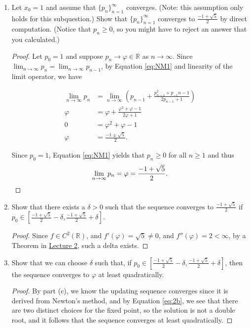 \documentclass[11pt,oneside,english,reqno]{amsart}
\theoremstyle{definition}
\newcommand{\MB}[1]{\mathbb{#1}}
\newcommand{\1}{\mathbbm{1}}
\begin{document}
\begin{enumerate}[leftmargin=*]
\begin{enumerate}
\item Let $x_0=1$ and assume that $\{p_n\}_{n=1}^\infty$ converges. (Note: this assumption only holds for this subquestion.) Show that $\{p_n\}_{n=1}^\infty$ converges to $\frac{-1+\sqrt{5}}{2}$ by direct computation. (Notice that $p_n\geq0$, so you might have to reject an answer that you calculated.)

\begin{proof}
Let $p_0=1$ and suppose $p_n\to\varphi\in\MB{R}$ as $n\to\infty$. Since $\lim_{n\to\infty}p_n=\lim_{n\to\infty}p_{n-1}$, by Equation \ref{eq:NM1} and linearity of the limit operator, we have

\begin{align}
\lim_{n\to\infty}p_{n}&=\lim_{n\to\infty}\left(p_{n-1}+\frac{p_{n-1}^2+p_{-1}n-1}{2p_{n-1}+1}\right) \nonumber \\[2mm]
\varphi&=\varphi+\frac{\varphi^2+\varphi-1}{2\varphi+1} \nonumber \\[2mm]
0&=\varphi^2+\varphi-1 \nonumber \\[2mm]
\varphi&=\frac{-1\pm\sqrt{5}}{2}.\label{eq:2b}
\end{align}

Since $p_0=1$, Equation \ref{eq:NM1} yields that $p_n\geq0$ for all $n\geq1$ and thus
\[
\lim_{n\to\infty}p_{n}=\varphi=\frac{-1+\sqrt{5}}{2}.\qedhere
\]
\end{proof}

\item Show that there exists a $\delta>0$ such that the sequence converges to $\frac{-1+\sqrt{5}}{2}$ if $p_0\in\left[\frac{-1+\sqrt{5}}{2}-\delta,\frac{-1+\sqrt{5}}{2}+\delta\right]$.

\begin{proof}
Since $f\in C^2(\MB{R})$, and $f'(\varphi)=\sqrt{5}\neq0$, and $f''(\varphi)=2<\infty$, by a Theorem in \href{https://discord.com/channels/927293874534248449/927293874534248452/928459358461890560}{Lecture 2}, such a delta exists.
\end{proof}

\item Show that we can choose $\delta$ such that, if $p_0\in\left[\frac{-1+\sqrt{5}}{2}-\delta,\frac{-1+\sqrt{5}}{2}+\delta\right]$, then the sequence converges to $\varphi$ at least quadratically.

\begin{proof}
By part (c), we know the updating sequence converges since it is derived from Newton's method, and by Equation \ref{eq:2b}, we see that there are two distinct choices for the fixed point, so the solution is not a double root, and it follows that the sequence converges at least quadratically.
\end{proof}


\end{enumerate}
\end{enumerate}
\end{document}
